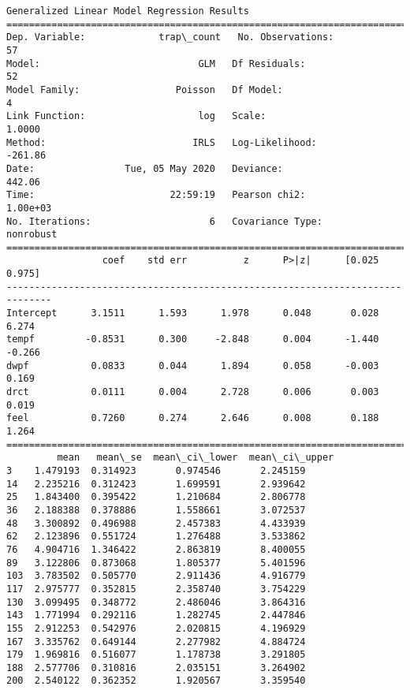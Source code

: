 \documentclass[11pt]{article}
\begin{document}
    \begin{Verbatim}[commandchars=\\\{\}]
                 Generalized Linear Model Regression Results                  
==============================================================================
Dep. Variable:             trap\_count   No. Observations:                   57
Model:                            GLM   Df Residuals:                       52
Model Family:                 Poisson   Df Model:                            4
Link Function:                    log   Scale:                          1.0000
Method:                          IRLS   Log-Likelihood:                -261.86
Date:                Tue, 05 May 2020   Deviance:                       442.06
Time:                        22:59:19   Pearson chi2:                 1.00e+03
No. Iterations:                     6   Covariance Type:             nonrobust
==============================================================================
                 coef    std err          z      P>|z|      [0.025      0.975]
------------------------------------------------------------------------------
Intercept      3.1511      1.593      1.978      0.048       0.028       6.274
tempf         -0.8531      0.300     -2.848      0.004      -1.440      -0.266
dwpf           0.0833      0.044      1.894      0.058      -0.003       0.169
drct           0.0111      0.004      2.728      0.006       0.003       0.019
feel           0.7260      0.274      2.646      0.008       0.188       1.264
==============================================================================
         mean   mean\_se  mean\_ci\_lower  mean\_ci\_upper
3    1.479193  0.314923       0.974546       2.245159
14   2.235216  0.312423       1.699591       2.939642
25   1.843400  0.395422       1.210684       2.806778
36   2.188388  0.378886       1.558661       3.072537
48   3.300892  0.496988       2.457383       4.433939
62   2.123896  0.551724       1.276488       3.533862
76   4.904716  1.346422       2.863819       8.400055
89   3.122806  0.873068       1.805377       5.401596
103  3.783502  0.505770       2.911436       4.916779
117  2.975777  0.352815       2.358740       3.754229
130  3.099495  0.348772       2.486046       3.864316
143  1.771994  0.292116       1.282745       2.447846
155  2.912253  0.542976       2.020815       4.196929
167  3.335762  0.649144       2.277982       4.884724
179  1.969816  0.516077       1.178738       3.291805
188  2.577706  0.310816       2.035151       3.264902
200  2.540122  0.362352       1.920567       3.359540

\end{Verbatim}
\end{document}
